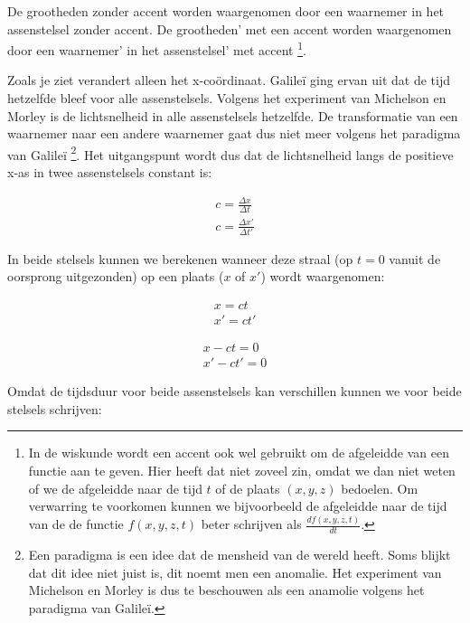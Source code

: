 De grootheden zonder accent worden waargenomen door een waarnemer in het
assenstelsel zonder accent. De grootheden' met een accent worden
waargenomen door een waarnemer' in het assenstelsel' met accent
\footnote{In de wiskunde wordt een accent ook wel gebruikt om de
afgeleidde van een functie aan te geven. Hier heeft dat niet zoveel zin,
omdat we dan niet weten of we de afgeleidde naar de tijd $t$ of de
plaats $(x,y,z)$ bedoelen. Om verwarring te voorkomen kunnen we
bijvoorbeeld de afgeleidde naar de tijd van de de functie $f(x,y,z,t)$
beter schrijven als $\frac{df(x,y,z,t)}{dt}$.}.

Zoals je ziet verandert alleen het x-coördinaat. Galileï ging ervan uit
dat de tijd hetzelfde bleef voor alle assenstelsels. Volgens het
experiment van Michelson en Morley is de lichtsnelheid in alle
assenstelsels hetzelfde. De transformatie van een waarnemer naar een
andere waarnemer gaat dus niet meer volgens het paradigma van Galileï
\footnote{Een paradigma is een idee dat de mensheid van de wereld heeft.
Soms blijkt dat dit idee niet juist is, dit noemt men een anomalie. Het
experiment van Michelson en Morley is dus te beschouwen als een anamolie
volgens het paradigma van Galileï.}. Het uitgangspunt wordt dus dat de
lichtsnelheid langs de positieve x-as in twee assenstelsels constant is:

\begin{equation}
\begin{array}{c}
c=\frac{\Delta x}{\Delta t}\\
c=\frac{\Delta x'}{\Delta t'}
\end{array}
\end{equation}


In beide stelsels kunnen we berekenen wanneer deze straal (op $t=0$
vanuit de oorsprong uitgezonden) op een plaats ($x$ of $x'$) wordt
waargenomen:

\begin{equation}
\begin{array}{c}
x=ct\\
x'=ct'
\end{array}
\end{equation}


\begin{equation}
\begin{array}{c}
x-ct=0\\
x'-ct'=0
\end{array}
\end{equation}


Omdat de tijdsduur voor beide assenstelsels kan verschillen kunnen
we voor beide stelsels schrijven:

